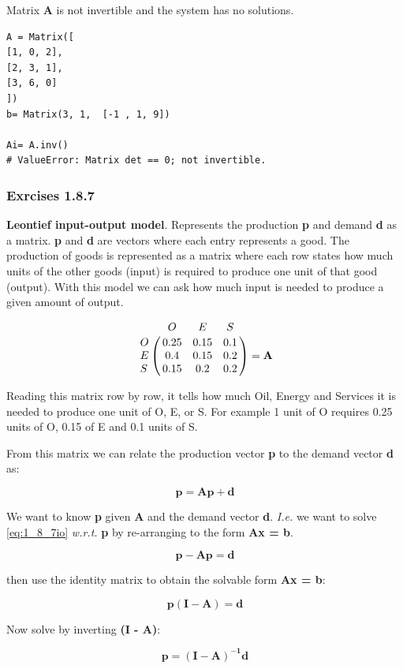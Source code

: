Matrix \textbf{A} is not invertible and the system has no solutions.

\begin{verbatim}
A = Matrix([
[1, 0, 2],
[2, 3, 1],
[3, 6, 0]
])
b= Matrix(3, 1,  [-1 , 1, 9])

Ai= A.inv()
# ValueError: Matrix det == 0; not invertible.
\end{verbatim}

\subsubsection{Exrcises 1.8.7}

\textbf{Leontief input-output model}. Represents the production \textbf{p} and
demand \textbf{d} as a matrix. \textbf{p} and \textbf{d} are vectors where each entry
represents a good. The production of goods is represented as a matrix where each row
states how much units of the other goods (input) is required to produce one unit
of that good (output). With this model we can ask how much input is needed to produce
a given amount of output.

$$
\bordermatrix{\text{}& O & E & S \cr
                 O & 0.25 &  0.15  & 0.1 \cr
                 E & 0.4  &  0.15  & 0.2 \cr
                 S & 0.15 &  0.2   & 0.2} = \mathbf{A}
$$

Reading this matrix row by row, it tells how much Oil, Energy and Services it is
needed to produce one unit of O, E, or S. For example 1 unit of O requires 0.25 units
of O, 0.15 of E and 0.1 units of S.

From this matrix we can relate the production vector \textbf{p} to the demand
vector \textbf{d} as:

\begin{equation}\label{eq:1_8_7io}
\mathbf{p} = \mathbf{Ap} + \mathbf{d}
\end{equation}


We want to know \textbf{p} given \textbf{A} and the demand vector \textbf{d}.
\emph{I.e.} we want to solve \ref{eq:1_8_7io} \emph{w.r.t.} \textbf{p} by re-arranging
to the form \textbf{Ax = b}.

$$\mathbf{
p - Ap = d
}$$

then use the identity matrix to obtain the solvable form \textbf{Ax = b}:

$$\mathbf{
p(I - A) = d
}$$

Now solve by inverting \textbf{(I - A)}:

$$\mathbf{
p = (I - A)^{-1} d
}$$


